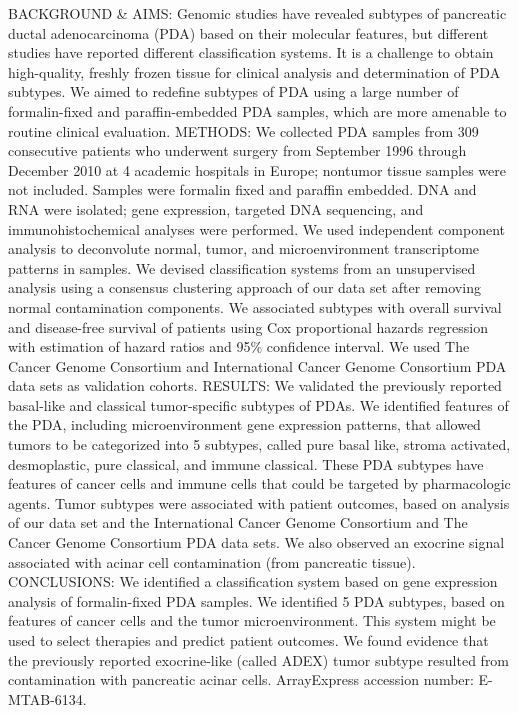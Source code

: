 \documentclass[]{article}
\begin{document}
BACKGROUND \& AIMS: Genomic studies have revealed subtypes of pancreatic
ductal adenocarcinoma (PDA) based on their molecular features, but
different studies have reported different classification systems. It is
a challenge to obtain high-quality, freshly frozen tissue for clinical
analysis and determination of PDA subtypes. We aimed to redefine
subtypes of PDA using a large number of formalin-fixed and
paraffin-embedded PDA samples, which are more amenable to routine
clinical evaluation. METHODS: We collected PDA samples from 309
consecutive patients who underwent surgery from September 1996 through
December 2010 at 4 academic hospitals in Europe; nontumor tissue samples
were not included. Samples were formalin fixed and paraffin embedded.
DNA and RNA were isolated; gene expression, targeted DNA sequencing, and
immunohistochemical analyses were performed. We used independent
component analysis to deconvolute normal, tumor, and microenvironment
transcriptome patterns in samples. We devised classification systems
from an unsupervised analysis using a consensus clustering approach of
our data set after removing normal contamination components. We
associated subtypes with overall survival and disease-free survival of
patients using Cox proportional hazards regression with estimation of
hazard ratios and 95\% confidence interval. We used The Cancer Genome
Consortium and International Cancer Genome Consortium PDA data sets as
validation cohorts. RESULTS: We validated the previously reported
basal-like and classical tumor-specific subtypes of PDAs. We identified
features of the PDA, including microenvironment gene expression
patterns, that allowed tumors to be categorized into 5 subtypes, called
pure basal like, stroma activated, desmoplastic, pure classical, and
immune classical. These PDA subtypes have features of cancer cells and
immune cells that could be targeted by pharmacologic agents. Tumor
subtypes were associated with patient outcomes, based on analysis of our
data set and the International Cancer Genome Consortium and The Cancer
Genome Consortium PDA data sets. We also observed an exocrine signal
associated with acinar cell contamination (from pancreatic tissue).
CONCLUSIONS: We identified a classification system based on gene
expression analysis of formalin-fixed PDA samples. We identified 5 PDA
subtypes, based on features of cancer cells and the tumor
microenvironment. This system might be used to select therapies and
predict patient outcomes. We found evidence that the previously reported
exocrine-like (called ADEX) tumor subtype resulted from contamination
with pancreatic acinar cells. ArrayExpress accession number:
E-MTAB-6134.
\end{document}
